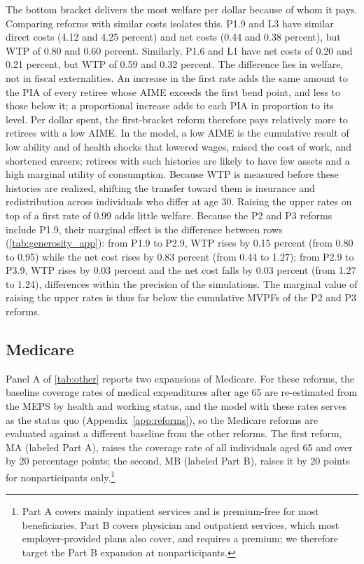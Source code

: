 The bottom bracket delivers the most welfare per dollar because of whom it pays. Comparing reforms with similar costs isolates this. P1.9 and L3 have similar direct costs (4.12 and 4.25 percent) and net costs (0.44 and 0.38 percent), but WTP of 0.80 and 0.60 percent. Similarly, P1.6 and L1 have net costs of 0.20 and 0.21 percent, but WTP of 0.59 and 0.32 percent. The difference lies in welfare, not in fiscal externalities. An increase in the first rate adds the same amount to the PIA of every retiree whose AIME exceeds the first bend point, and less to those below it; a proportional increase adds to each PIA in proportion to its level. Per dollar spent, the first-bracket reform therefore pays relatively more to retirees with a low AIME. In the model, a low AIME is the cumulative result of low ability and of health shocks that lowered wages, raised the cost of work, and shortened careers; retirees with such histories are likely to have few assets and a high marginal utility of consumption. Because WTP is measured before these histories are realized, shifting the transfer toward them is insurance and redistribution across individuals who differ at age 30. Raising the upper rates on top of a first rate of 0.99 adds little welfare. Because the P2 and P3 reforms include P1.9, their marginal effect is the difference between rows (\autoref{tab:generosity_app}): from P1.9 to P2.9, WTP rises by 0.15 percent (from 0.80 to 0.95) while the net cost rises by 0.83 percent (from 0.44 to 1.27); from P2.9 to P3.9, WTP rises by 0.03 percent and the net cost falls by 0.03 percent (from 1.27 to 1.24), differences within the precision of the simulations. The marginal value of raising the upper rates is thus far below the cumulative MVPFs of the P2 and P3 reforms.

\subsection{Medicare}\label{sec:results_medicare}

Panel A of \autoref{tab:other} reports two expansions of Medicare. For these reforms, the baseline coverage rates of medical expenditures after age 65 are re-estimated from the MEPS by health and working status, and the model with these rates serves as the status quo (Appendix~\ref{app:reforms}), so the Medicare reforms are evaluated against a different baseline from the other reforms. The first reform, MA (labeled Part A), raises the coverage rate of all individuals aged 65 and over by 20 percentage points; the second, MB (labeled Part B), raises it by 20 points for nonparticipants only.\footnote{Part A covers mainly inpatient services and is premium-free for most beneficiaries. Part B covers physician and outpatient services, which most employer-provided plans also cover, and requires a premium; we therefore target the Part B expansion at nonparticipants.} %

